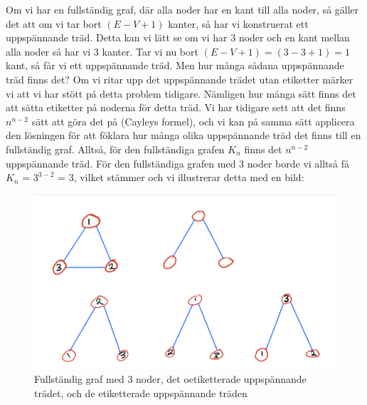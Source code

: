 \documentclass[nobib]{tufte-handout}
\begin{document}
\begin{solution}

Om vi har en fullständig graf, där alla noder har en kant till alla noder, så gäller det att om vi tar bort $(E - V + 1)$ kanter, så har vi konstruerat ett uppspännande träd. Detta kan vi lätt se om vi har $3$ noder och en kant mellan alla noder så har vi $3$ kanter. Tar vi nu bort $(E - V + 1) = (3 - 3 + 1) = 1$ kant, så får vi ett uppspännande träd. Men hur många sådana uppspännande träd finns det? Om vi ritar upp det uppspännande trädet utan etiketter märker vi att vi har stött på detta problem tidigare. Nämligen hur många sätt finns det att sätta etiketter på noderna för detta träd. Vi har tidigare sett att det finns $n^{n-2}$ sätt att göra det på (Cayleys formel), och vi kan på samma sätt applicera den lösningen för att föklara hur många olika uppspännande träd det finns till en fullständig graf. Alltså, för den fullständiga grafen $K_n$ finns det $n^{n-2}$ uppspännande träd. För den fullständiga grafen med 3 noder borde vi alltså få $K_n$ = $3^{3-2}$ = $3$, vilket stämmer och vi illustrerar detta med en bild:

\begin{figure}
    \centering
    \includegraphics{graphics/F8/Spanningtrees.jpeg}
    \caption{Fullständig graf med 3 noder, det oetiketterade uppspännande trädet, och de etiketterade uppspännande träden}
    \label{fig:my_label}
\end{figure}
 
\end{solution}
%
%
\end{document}
